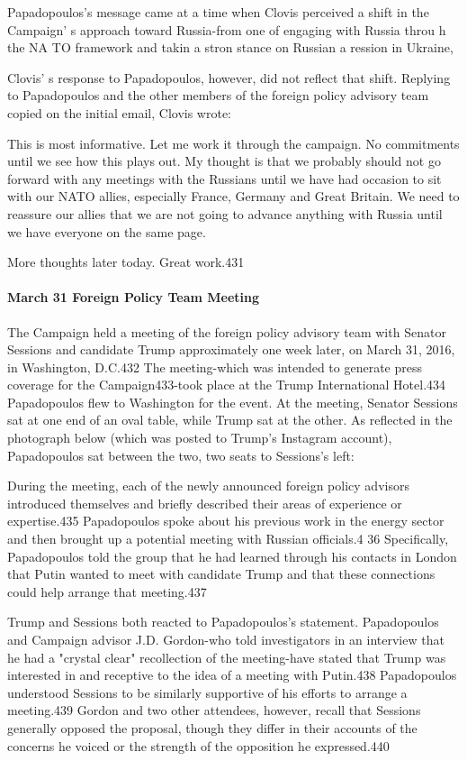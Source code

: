 Papadopoulos's message came at a time when Clovis perceived a shift in the Campaign' s approach toward Russia-from one of engaging with Russia throu h  the NA TO framework and takin a stron stance on Russian a ression in Ukraine,

Clovis' s  response to Papadopoulos,  however, did not reflect that shift. Replying to Papadopoulos and the other members of the foreign policy advisory team copied on the initial email, Clovis wrote:

This is most informative. Let me work it through the campaign. No commitments until we see how this plays out. My thought is that we probably should not go forward with any meetings with the Russians until we have had occasion to sit with our NATO allies, especially France, Germany and Great Britain. We need to reassure our allies that we are not going to advance anything with Russia until we have everyone on the same page.

More thoughts later today. Great work.431

\paragraph{March 31 Foreign Policy Team Meeting}

The Campaign held a  meeting of the foreign policy advisory team with Senator Sessions and candidate Trump approximately one week later, on March 31, 2016, in Washington, D.C.432 The meeting-which was intended to generate press coverage for the Campaign433-took place at the Trump International Hotel.434 Papadopoulos flew to Washington for the event. At the meeting, Senator Sessions sat at one end of an oval table, while Trump sat at the other. As reflected in the photograph below (which was posted to Trump's Instagram account), Papadopoulos sat between the two, two seats to Sessions's left:

During the meeting, each of the newly announced foreign policy advisors introduced themselves and briefly described their areas of experience or expertise.435 Papadopoulos spoke about his previous work in the energy sector and then brought up a potential meeting with Russian officials.4 36 Specifically, Papadopoulos told the group that he had learned through his contacts in London that Putin wanted to meet with candidate Trump and that these  connections could help arrange that meeting.437

Trump and Sessions both reacted to Papadopoulos's statement. Papadopoulos and Campaign advisor J.D. Gordon-who told investigators in an interview that he had a  "crystal clear" recollection of the meeting-have stated that Trump was interested in and receptive to the idea of a meeting with Putin.438 Papadopoulos understood Sessions to be similarly supportive of his efforts to arrange a meeting.439 Gordon and two other attendees, however, recall that Sessions generally opposed the proposal, though they differ in their accounts of the concerns he voiced or the strength of the opposition he expressed.440

